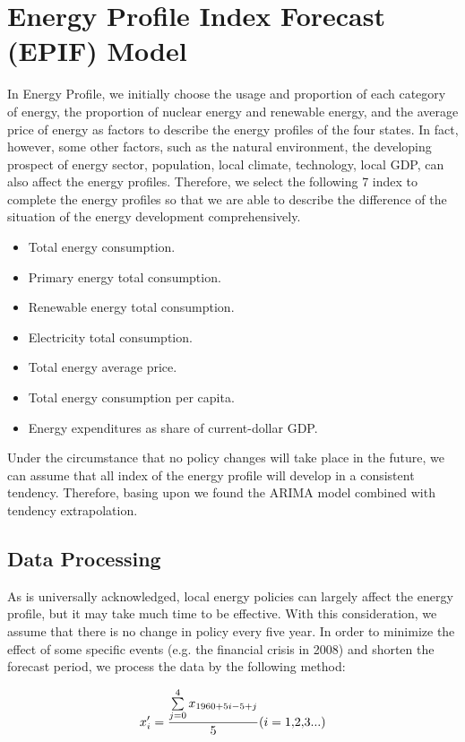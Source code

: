 \section{Energy Profile Index Forecast (EPIF) Model}

In Energy Profile, we initially choose the usage and proportion of each category of energy, the proportion of nuclear energy and renewable energy, and the average price of energy as factors to describe the energy profiles of the four states. In fact, however, some other factors, such as the natural environment, the developing prospect of energy sector, population, local climate, technology, local GDP, can also affect the energy profiles. Therefore, we select the following 7 index to complete the energy profiles so that we are able to describe the difference of the situation of the energy development comprehensively.
  \begin{itemize}
\item Total energy consumption.
\item Primary energy total consumption.
\item Renewable energy total consumption. 
\item Electricity total consumption.
\item Total energy average price.
\item Total energy consumption per capita. 
\item  Energy expenditures as share of current-dollar GDP.

\end{itemize}

Under the circumstance that no policy changes will take place in the future, we can assume that all index of the energy profile will develop in a consistent tendency. Therefore, basing upon we found the ARIMA model combined with tendency extrapolation.
\subsection{Data Processing}
As is universally acknowledged, local energy policies can largely affect the energy profile, but it may take much time to be effective. With this consideration, we assume that there is no change in policy every five year. In order to minimize the effect of some specific events (e.g. the financial crisis in 2008) and shorten the forecast period, we process the data by the following method:

$${x'_i} = \frac{{\sum\limits_{j = 0}^4 {{x_{1960 + 5i - 5 + j}}} }}{5}(i = 1{\rm{,}}2{\rm{,}}3...)$$
